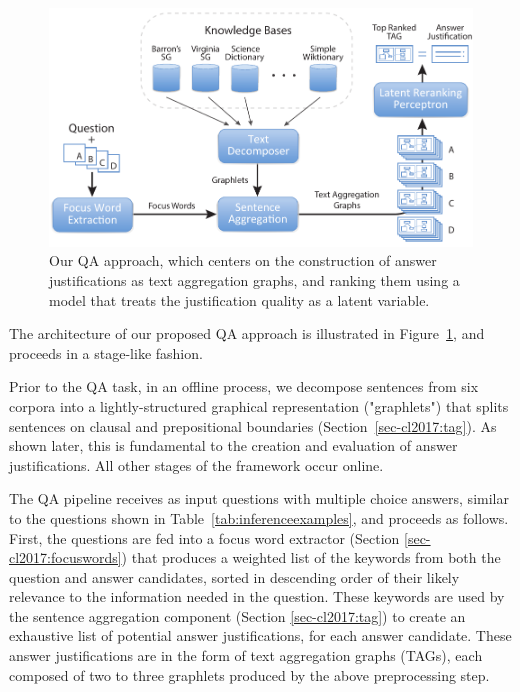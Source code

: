 \begin{figure}[t!]
\centering

\includegraphics[width=1.0\textwidth]{mainmatter/tacl2015-tig/tag_architecture6c.pdf}

\caption{Our QA approach, which centers on the construction of answer justifications as text aggregation graphs, and ranking them using a model that treats the justification quality as a latent variable.}
\label{fig:architecture}
\end{figure}

The architecture of our proposed QA approach is illustrated in Figure~\ref{fig:architecture}, and proceeds in a stage-like fashion.  

Prior to the QA task, in an offline process, we decompose sentences from six corpora into a lightly-structured graphical representation ("graphlets") that splits sentences on clausal and prepositional boundaries (Section~\ref{sec-cl2017:tag}). As shown later, this is fundamental to the creation and evaluation of answer justifications.  All other stages of the framework occur online. 

The QA pipeline receives as input questions with multiple choice answers, similar to the questions shown in Table~\ref{tab:inferenceexamples}, and proceeds as follows. First, the questions are fed into a focus word extractor (Section \ref{sec-cl2017:focuswords}) that produces a weighted list of the keywords from both the question and answer candidates, sorted in descending order of their likely relevance to the information needed in the question. These keywords are used by the sentence aggregation component (Section \ref{sec-cl2017:tag}) to create an exhaustive list of potential answer justifications, for each answer candidate.  These answer justifications are in the form of text aggregation graphs (TAGs), each composed of two to three graphlets produced by the above preprocessing step.

